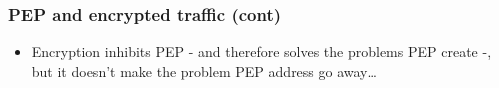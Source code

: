 \begin{frame}
  \frametitle{PEP and encrypted traffic (cont)}
  \begin{itemize}
    \item Encryption inhibits PEP - and therefore solves the problems PEP create -, but it doesn't make the problem PEP address go away\ldots
  \end{itemize}
\end{frame}
